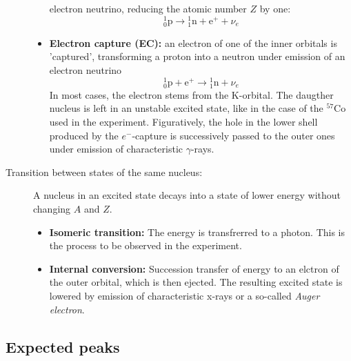 \begin{description}
\begin{itemize}
                electron neutrino, reducing the atomic number $Z$ by one:
                \begin{equation}
                    {}^{1}_{0} \mathrm {p} \to {}^{1}_{1} \mathrm {n} + \mathrm{e}^{+} + \nu_e 
                \end{equation}
            \item
                \textbf{Electron capture (EC):} an electron of one of the inner orbitals is 'captured', transforming a proton 
                into a neutron under emission of an electron neutrino
                \begin{equation}
                    {}^{1}_{0} \mathrm {p} + \mathrm{e}^{+} \to {}^{1}_{1} \mathrm {n} + \nu_e 
                \end{equation}
                In most cases, the electron stems from the K-orbital. The daugther nucleus is left in 
                an unstable excited state, like in the case of the $^{57}$Co used in the experiment. 
                Figuratively, the hole in the lower shell produced by the $e^-$-capture is successively 
                passed to the outer ones under emission of characteristic $\gamma$-rays. 
        \end{itemize}
    \item [Transition between states of the same nucleus:] 
        A nucleus in an excited state decays into a state of 
        lower energy without changing $A$ and $Z$.
        \begin{itemize}
            \item
                \textbf{Isomeric transition:} The energy is transfrerred to a photon. This is the process to be observed 
                in the experiment. 
            \item
                \textbf{Internal conversion:} Succession transfer of energy to an elctron of the outer orbital, 
                which is then ejected. The resulting excited state is lowered by emission of characteristic 
                x-rays or a so-called \emph{Auger electron}. 
        \end{itemize}
\end{description}

\subsection{Expected peaks}
